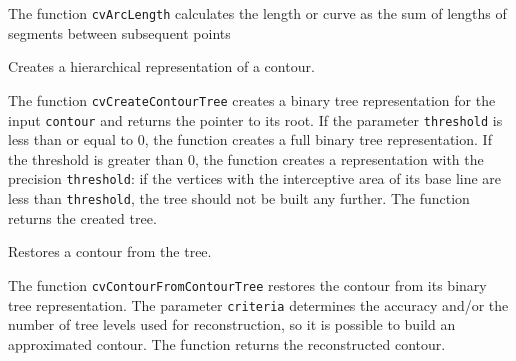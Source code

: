 The function \texttt{cvArcLength} calculates the length or curve as the sum of lengths of segments between subsequent points

\label{CreateContourTree}

Creates a hierarchical representation of a contour.


\begin{description}
\end{description}

The function \texttt{cvCreateContourTree} creates a binary tree representation for the input \texttt{contour} and returns the pointer to its root. If the parameter \texttt{threshold} is less than or equal to 0, the function creates a full binary tree representation. If the threshold is greater than 0, the function creates a representation with the precision \texttt{threshold}: if the vertices with the interceptive area of its base line are less than \texttt{threshold}, the tree should not be built any further. The function returns the created tree.

\label{ContourFromContourTree}

Restores a contour from the tree.


\begin{description}
\end{description}

The function \texttt{cvContourFromContourTree} restores the contour from its binary tree representation. The parameter \texttt{criteria} determines the accuracy and/or the number of tree levels used for reconstruction, so it is possible to build an approximated contour. The function returns the reconstructed contour.

